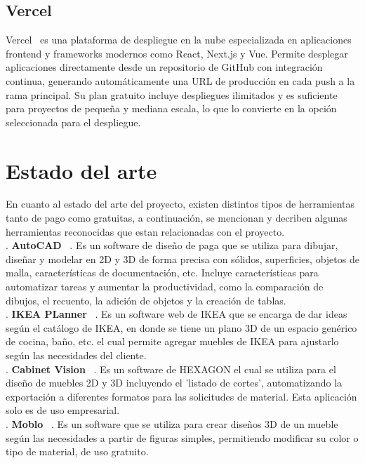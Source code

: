﻿\documentclass{iccmemoria}
\begin{document}
\subsection{Vercel}
Vercel~\cite{vercel} es una plataforma de despliegue en la nube especializada en aplicaciones frontend y frameworks modernos como React, Next.js y Vue. Permite desplegar aplicaciones directamente desde un repositorio de GitHub con integración continua, generando automáticamente una URL de producción en cada push a la rama principal. Su plan gratuito incluye despliegues ilimitados y es suficiente para proyectos de pequeña y mediana escala, lo que lo convierte en la opción seleccionada para el despliegue.\\

\section{Estado del arte}
En cuanto al estado del arte del proyecto, existen distintos tipos de herramientas tanto de pago como gratuitas, a continuación, se mencionan y decriben algunas herramientas reconocidas que estan relacionadas con el proyecto.\\

. \textbf{AutoCAD} ~\cite{AutoCAD}.  Es un software de diseño de paga que se utiliza para dibujar, diseñar y modelar en 2D y 3D de forma precisa con sólidos, superficies, objetos de malla, características de documentación, etc. Incluye características para automatizar tareas y aumentar la productividad, como la comparación de dibujos, el recuento, la adición de objetos y la creación de tablas.\\

. \textbf{IKEA PLanner} ~\cite{IKEA}. Es un software web de IKEA que se encarga de dar ideas según el catálogo de IKEA, en donde se tiene un plano 3D de un espacio genérico de cocina, baño, etc. el cual permite agregar muebles de IKEA para ajustarlo según las necesidades del cliente. \\

. \textbf{Cabinet Vision} ~\cite{Cabinet_Vision}. Es un software de HEXAGON el cual se utiliza para el diseño de muebles 2D y 3D incluyendo el 'listado de cortes', automatizando la exportación a diferentes formatos para las solicitudes de material. Esta aplicación solo es de uso empresarial.\\

. \textbf{Moblo} ~\cite{Moblo}. Es un software que se utiliza para crear diseños 3D de un mueble según las necesidades a partir de figuras simples, permitiendo modificar su color o tipo de material, de uso gratuito. \\
\end{document}
